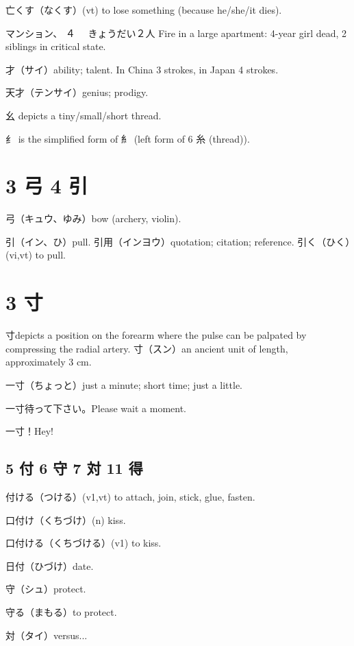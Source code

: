 亡くす（なくす）(vt) to lose something (because he/she/it dies).

マンション、%
４%
　きょうだい２人
Fire in a large apartment: 4-year girl dead, 2 siblings in critical state.

才（サイ）ability; talent.
In China 3 strokes, in Japan 4 strokes.

天才（テンサイ）genius; prodigy.

幺 depicts a tiny/small/short thread.

纟 is the simplified form of 糹
(left form of 6 糸 (thread)).

\section{3 弓 4 引}

弓（キュウ、ゆみ）bow (archery, violin).

引（イン、ひ）pull.
引用（インヨウ）quotation; citation; reference.
引く（ひく）(vi,vt) to pull.

\section{3 寸}

寸depicts a position on the forearm
where the pulse can be palpated by compressing the radial artery.
寸（スン）an ancient unit of length, approximately 3 cm.

一寸（ちょっと）just a minute; short time; just a little.

一寸待って下さい。Please wait a moment.

一寸！Hey!

\subsection{5 付 6 守 7 対 11 得}

付ける（つける）(v1,vt) to attach, join, stick, glue, fasten.

口付け（くちづけ）(n) kiss.

口付ける（くちづける）(v1) to kiss.

日付（ひづけ）date.

守（シュ）protect.

守る（まもる）to protect.

対（タイ）versus...

